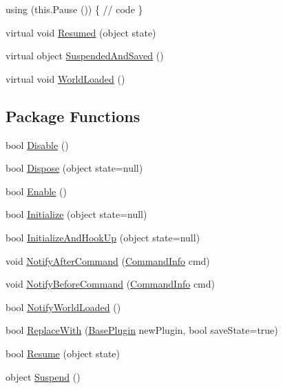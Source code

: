 \begin{DoxyCompactItemize}
\begin{DoxyCompactList}
using (this.\+Pause ()) \{ // code \} \end{DoxyCompactList}\item 
virtual void \hyperlink{classOTA_1_1Plugin_1_1BasePlugin_a301511e40e501f5408919bad0dad8695}{Resumed} (object state)
\item 
virtual object \hyperlink{classOTA_1_1Plugin_1_1BasePlugin_a250b8acc3348f42b30077ef17c39e750}{Suspended\+And\+Saved} ()
\item 
virtual void \hyperlink{classOTA_1_1Plugin_1_1BasePlugin_a756fe44dfeb738b144ad91ef76ae2e7f}{World\+Loaded} ()
\end{DoxyCompactItemize}
\subsection*{Package Functions}
\begin{DoxyCompactItemize}
\item 
bool \hyperlink{classOTA_1_1Plugin_1_1BasePlugin_ac710f234371d170bd24330dd37a94975}{Disable} ()
\item 
bool \hyperlink{classOTA_1_1Plugin_1_1BasePlugin_a8796a88bde9d151a6d2a6a3b73eb6a46}{Dispose} (object state=null)
\item 
bool \hyperlink{classOTA_1_1Plugin_1_1BasePlugin_ac811d17a0f3a1d7c2a01865e35de31d5}{Enable} ()
\item 
bool \hyperlink{classOTA_1_1Plugin_1_1BasePlugin_aff4a32cf41e174ee40e486cffb941da4}{Initialize} (object state=null)
\item 
bool \hyperlink{classOTA_1_1Plugin_1_1BasePlugin_a534c4fa3341023f4ba6f8d8d36cc5c0e}{Initialize\+And\+Hook\+Up} (object state=null)
\item 
void \hyperlink{classOTA_1_1Plugin_1_1BasePlugin_a0dbd9fc841e39de924f74d6f78f0a391}{Notify\+After\+Command} (\hyperlink{classOTA_1_1Command_1_1CommandInfo}{Command\+Info} cmd)
\item 
void \hyperlink{classOTA_1_1Plugin_1_1BasePlugin_ac2a40443dd8cda49928e391c8ef68429}{Notify\+Before\+Command} (\hyperlink{classOTA_1_1Command_1_1CommandInfo}{Command\+Info} cmd)
\item 
bool \hyperlink{classOTA_1_1Plugin_1_1BasePlugin_a8ee57ccbf7bc0d892fe97b9b121368c7}{Notify\+World\+Loaded} ()
\item 
bool \hyperlink{classOTA_1_1Plugin_1_1BasePlugin_a49cc7f2b3bab579cbb9dd70461f077c5}{Replace\+With} (\hyperlink{classOTA_1_1Plugin_1_1BasePlugin}{Base\+Plugin} new\+Plugin, bool save\+State=true)
\item 
bool \hyperlink{classOTA_1_1Plugin_1_1BasePlugin_a835ee20f7494f8435b4e9bf49a85b6ac}{Resume} (object state)
\item 
object \hyperlink{classOTA_1_1Plugin_1_1BasePlugin_ac4134883489a7722836a2f7fceeaa540}{Suspend} ()
\end{DoxyCompactItemize}
